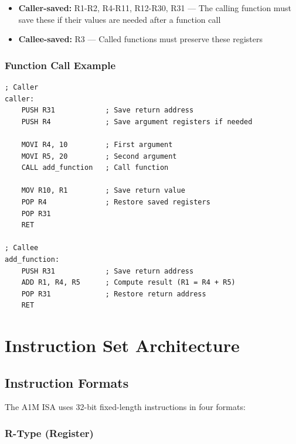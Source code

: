 \documentclass[12pt,a4paper,oneside]{book}
\begin{document}
\begin{itemize}
    \item \textbf{Caller-saved:} R1-R2, R4-R11, R12-R30, R31 --- The calling function must save these if their values are needed after a function call
    \item \textbf{Callee-saved:} R3 --- Called functions must preserve these registers
\end{itemize}

\subsection{Function Call Example}

\begin{lstlisting}[style=assembly, caption={Register Usage in Function Calls}]
; Caller
caller:
    PUSH R31            ; Save return address
    PUSH R4             ; Save argument registers if needed
    
    MOVI R4, 10         ; First argument
    MOVI R5, 20         ; Second argument
    CALL add_function   ; Call function
    
    MOV R10, R1         ; Save return value
    POP R4              ; Restore saved registers
    POP R31
    RET

; Callee
add_function:
    PUSH R31            ; Save return address
    ADD R1, R4, R5      ; Compute result (R1 = R4 + R5)
    POP R31             ; Restore return address
    RET
\end{lstlisting}


\chapter{Instruction Set Architecture}

\section{Instruction Formats}

The A1M ISA uses 32-bit fixed-length instructions in four formats:

\subsection{R-Type (Register)}
\end{document}
